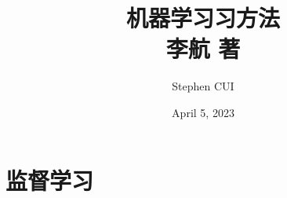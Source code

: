 \documentclass[openany]{book}
\title{\textbf{机器学习习方法}\\李航 著}
\author{Stephen CUI\orcidlink{0009-0008-2664-5882}}
\date{April 5, 2023}
\begin{document}
\maketitle
\tableofcontents
\part{监督学习}


\end{document}
